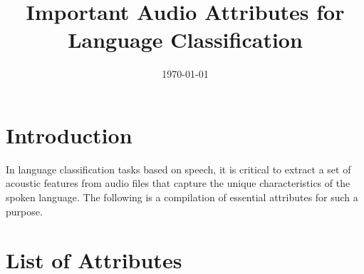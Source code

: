 \documentclass{article}
\title{Important Audio Attributes for Language Classification}
\date{\today}
\begin{document}
\maketitle

\section{Introduction}
In language classification tasks based on speech, it is critical to extract a set of acoustic features from audio files that capture the unique characteristics of the spoken language. The following is a compilation of essential attributes for such a purpose.

\section{List of Attributes}
\end{document}
